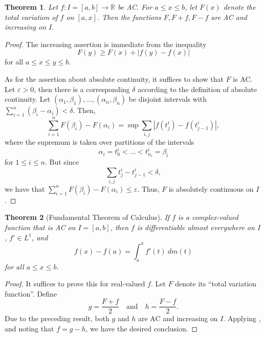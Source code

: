 \documentclass[12pt]{article}
\theoremstyle{thmstyle}
\newtheorem{theorem}{Theorem}[section]
\theoremstyle{defstyle}
\newcommand{\R}{\mathbb{R}}
\renewcommand{\le}{\leqslant}
\renewcommand{\ge}{\geqslant}
\begin{document}
\begin{theorem}
    Let $f: I = [a,b]\to\R$ be AC. For $a\le x\le b$, let $F(x)$ denote the total variation of $f$ on $[a, x]$. Then the functions $F, F + f, F - f$ are AC and increasing on $I$.
\end{theorem}
\begin{proof}
    The increasing assertion is immediate from the inequality 
    \begin{equation*}
        F(y)\ge F(x) + |f(y) - f(x)|
    \end{equation*}
    for all $a\le x\le y\le b$.

    As for the assertion about absolute continuity, it suffices to show that $F$ is AC. Let $\varepsilon > 0$, then there is a corresponding $\delta$ according to the definition of absolute continuity. Let $(\alpha_1,\beta_1),\dots,(\alpha_n,\beta_n)$ be disjoint intervals with $\displaystyle\sum_{i = 1}^n (\beta_i - \alpha_i) < \delta$. Then, 
    \begin{equation*}
        \sum_{i = 1}^n F(\beta_i) - F(\alpha_i) = \sup \sum_{i, j}|f(t^i_j) - f(t^i_{j - 1})|,
    \end{equation*}
    where the supremum is taken over partitions of the intervals 
    \begin{equation*}
        \alpha_i = t^i_0 < \dots < t^i_{n_i} = \beta_i
    \end{equation*}
    for $1\le i\le n$. But since 
    \begin{equation*}
        \sum_{i, j}t^i_j - t^i_{j - 1} < \delta,
    \end{equation*}
    we have that $\sum_{i = 1}^n F(\beta_i) - F(\alpha_i)\le\varepsilon$. Thus, $F$ is absolutely continuous on $I$.
\end{proof}

\begin{theorem}[Fundamental Theorem of Calculus]
    If $f$ is a complex-valued function that is AC on $I = [a,b]$, then $f$ is differentiable almost everywhere on $I$, $f'\in L^1$, and 
    \begin{equation*}
        f(x) - f(a) = \int_a^x f'(t)~dm(t)
    \end{equation*}
    for all $a\le x\le b$.
\end{theorem}
\begin{proof}
    It suffices to prove this for real-valued $f$. Let $F$ denote its ``total variation function''. Define 
    \begin{equation*}
        g = \frac{F + f}{2}\quad\text{and}\quad h = \frac{F - f}{2}.
    \end{equation*}
    Due to the preceding result, both $g$ and $h$ are AC and increasing on $I$. Applying , and noting that $f = g - h$, we have the desired conclusion.
\end{proof}
\end{document}
